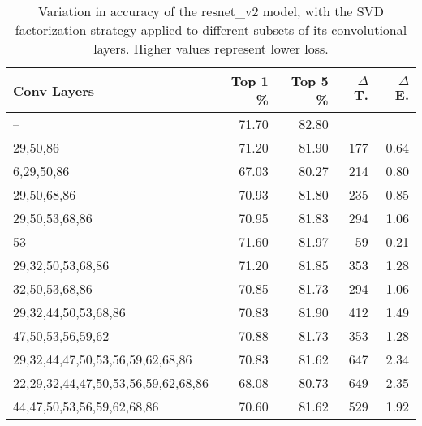 \begin{table}
\centering
\begin{tabular}{|l|r|r|r|r|}
\hline
Conv Layers & Top 1 \% & Top 5 \% & $\Delta$ T. & $\Delta$ E. \\\hline
-- & 71.70 & 82.80 &  & \\\hline
29,50,86 & 71.20 & 81.90 & 177 & 0.64 \\\hline
6,29,50,86 & 67.03 & 80.27 & 214 & 0.80 \\\hline
29,50,68,86 & 70.93 & 81.80 & 235 & 0.85 \\\hline
29,50,53,68,86 & 70.95 & 81.83 & 294 & 1.06 \\\hline
53 & 71.60 & 81.97 & 59 & 0.21 \\\hline
29,32,50,53,68,86 & 71.20 & 81.85 & 353 & 1.28 \\\hline
32,50,53,68,86 & 70.85 & 81.73 & 294 & 1.06 \\\hline
29,32,44,50,53,68,86 & 70.83 & 81.90 & 412 & 1.49 \\\hline
47,50,53,56,59,62 & 70.88 & 81.73 & 353 & 1.28 \\\hline
29,32,44,47,50,53,56,59,62,68,86 & 70.83 & 81.62 & 647 & 2.34 \\\hline
22,29,32,44,47,50,53,56,59,62,68,86 & 68.08 & 80.73 & 649 & 2.35 \\\hline
44,47,50,53,56,59,62,68,86 & 70.60 & 81.62 & 529 & 1.92 \\\hline
\end{tabular}
\caption{Variation in accuracy of the resnet\_v2 model, with the SVD factorization strategy applied to different subsets of its convolutional layers. Higher values represent lower loss.}
\label{resnet_v2-accuracy}
\end{table}
